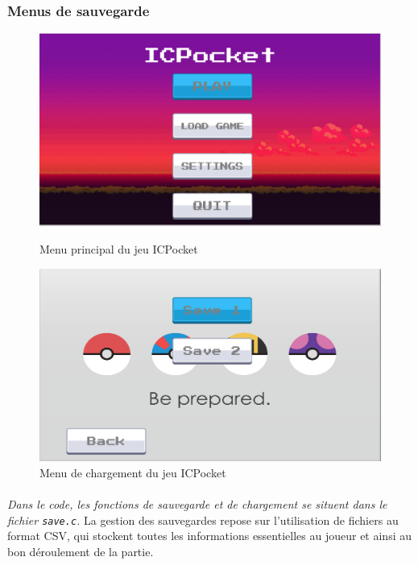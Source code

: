 \documentclass[12pt,a4paper, twoside]{article}
\begin{document}
     \subsubsection{Menus de sauvegarde}
     \begin{figure}[h!]
        \centering
        \begin{minipage}[t]{0.48\textwidth}
            \centering
            \includegraphics[width=\textwidth]{menuicmonp.png}
            \caption{Menu principal du jeu ICPocket}
            \label{fig:menuicmonp}
        \end{minipage}
        \hfill
        \begin{minipage}[t]{0.48\textwidth}
            \centering
            \includegraphics[width=\textwidth]{menuload.png}
            \caption{Menu de chargement du jeu ICPocket}
            \label{fig:menuload}
        \end{minipage}
    \end{figure}
    \paragraph{} \emph{Dans le code, les fonctions de sauvegarde et de chargement se situent dans le fichier \texttt{save.c}.}
     La gestion des sauvegardes repose sur l'utilisation de fichiers au format CSV, qui stockent toutes les informations essentielles au joueur et ainsi au bon déroulement de la partie.\\
\end{document}
